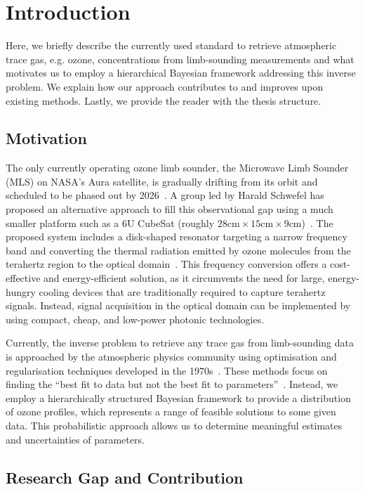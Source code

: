 \chapter{Introduction}
Here, we briefly describe the currently used standard to retrieve atmospheric trace gas, e.g. ozone, concentrations from limb-sounding measurements and what motivates us to employ a hierarchical Bayesian framework addressing this inverse problem.
We explain how our approach contributes to and improves upon existing methods.
Lastly, we provide the reader with the thesis structure.


\section{Motivation}
The only currently operating ozone limb sounder, the Microwave Limb Sounder (MLS) on NASA's Aura satellite, is gradually drifting from its orbit and scheduled to be phased out by 2026~\cite{Bryan2024NASA}.
A group led by Harald Schwefel has proposed an alternative approach to fill this observational gap using a much smaller platform such as a 6U CubeSat (roughly $28\text{cm} \times 15\text{cm} \times 9\text{cm}$)~\cite{ustin2024current}. 
The proposed system includes a disk-shaped resonator targeting a narrow frequency band and converting the thermal radiation emitted by ozone molecules from the terahertz region to the optical domain~\cite{Suresh25,Sedlmeir14}. 
This frequency conversion offers a cost-effective and energy-efficient solution, as it circumvents the need for large, energy-hungry cooling devices that are traditionally required to capture terahertz signals. 
Instead, signal acquisition in the optical domain can be implemented by using compact, cheap, and low-power photonic technologies.

Currently, the inverse problem to retrieve any trace gas from limb-sounding data is approached by the atmospheric physics community using optimisation and regularisation techniques developed in the 1970s~\cite{rodgers1976retrieval, NASA2022MLSv5}.
These methods focus on finding the ``best fit to data but not the best fit to parameters''~\cite{tan2016LecNot}.
Instead, we employ a hierarchically structured Bayesian framework to provide a distribution of ozone profiles, which represents a range of feasible solutions to some given data.
This probabilistic approach allows us to determine meaningful estimates and uncertainties of parameters.

\section{Research Gap and Contribution}

